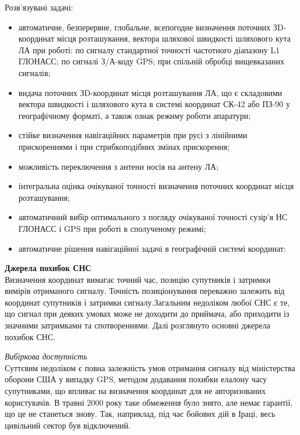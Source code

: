 Розв'язувані задачі:
\begin{itemize}

\item автоматичне, безперервне, глобальне, всепогодне визначення поточних ЗD-координат 
місця розташування, вектора шляхової швидкості шляхового кута ЛА при роботі: по 
сигналу стандартної точності частотного діапазону L1 ГЛОНАСС; по сигналі З/А-коду 
GPS; при спільній обробці вищевказаних сигналів;

\item видача поточних ЗD-координат місця розташування ЛА, що є складовими вектора 
швидкості і шляхового кута в системі координат СК-42 або ПЗ-90 у географічному 
форматі, а також ознак режиму роботи апаратури;

\item стійке визначення навігаційних параметрів при русі з лінійними прискореннями 
і при стрибкоподібних змінах прискорення;

\item  можливість переключення з антени носія на антену ЛА; 

\item інтегральна оцінка очікуваної точності визначення поточних координат місця розташування;

\item автоматичний вибір оптимального з погляду очікуваної точності сузір'я НС ГЛОНАСС і GPS при роботі в сполученому режимі;

\item автоматичне рішення навігаційної задачі в географічній системі координат:  
\end{itemize}

\vspace{5mm}
\textbf{Джерела похибок СНС} \\ 
Визначення координат вимагає точний час, позицію супутників і затримки вимірів 
отриманого сигналу. Точність позиціонування переважно залежить від координат 
супутників і затримки сигналу.Загальним недоліком любої СНС є те, що сигнал при деяких умовах може не доходити 
до приймача, або приходити із значними затримками та спотвореннями. Далі розглянуто 
основні джерела похибок СНС.

\vspace{5mm}
\textit{Вибіркова доступність} \\
Суттєвим недоліком є повна залежність умов отримання сигналу від міністерства 
оборони США у випадку GPS, методом додавання похибки елалону часу супутниками, що 
впливає на визначення координат для не авторизованих користувачів. В травні 2000  
року таке обмеження було знято, але немає гарантії, що це не станеться знову. 
Так, наприклад, під час бойових дій в Іраці, весь цивільний сектор був відключений.

